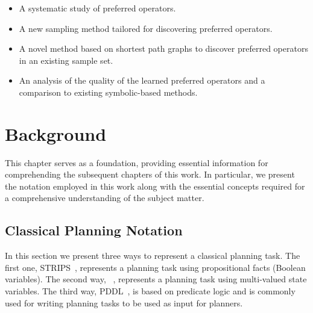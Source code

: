 \documentclass[ppgc,diss,english]{iiufrgs}
\begin{document}
\begin{itemize}
\item A systematic study of preferred operators.
\item A new sampling method tailored for discovering preferred operators.
\item A novel method based on shortest path graphs to discover preferred operators in an existing sample set.
\item An analysis of the quality of the learned preferred operators and a comparison to existing symbolic-based methods.
\end{itemize}
%
%
\chapter{Background}
This chapter serves as a foundation, providing essential information for comprehending the subsequent chapters of this work. In particular, we present the notation employed in this work along with the essential concepts required for a comprehensive understanding of the subject matter.

\section{Classical Planning Notation}
In this section we present three ways to represent a classical planning task. The first one, STRIPS~\cite{Fikes.Nilsson/1971}, represents a planning task using propositional facts (Boolean variables). The second way, \sas~\cite{Backstrom.Nebel/1995}, represents a planning task using multi-valued state variables. The third way, PDDL~\cite{Ghallab.etal/1998}, is based on predicate logic and is commonly used for writing planning tasks to be used as input for planners.
\end{document}
